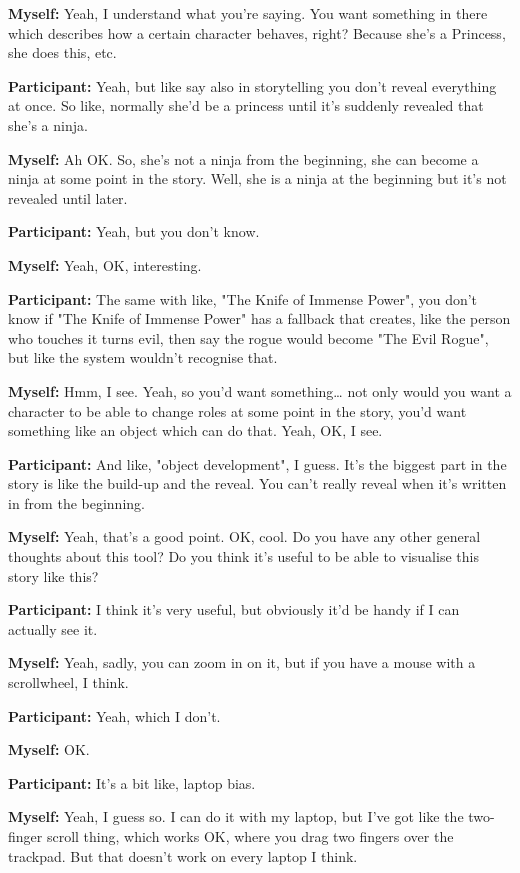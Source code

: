 \documentclass[11pt]{report}
\newcommand{\llabel}[1]{\hypertarget{llineno:#1}{\linelabel{#1}}}
\begin{document}
\begin{linenumbers}
\textbf{Myself:} Yeah, I understand what you're saying. You want something in there which describes how a certain character behaves, right? Because she's a Princess, she does this, etc.

\textbf{Participant:} Yeah, but like say also in storytelling you don't reveal everything at once. So like, normally she'd be a princess until it's suddenly revealed that she's a ninja.\llabel{lne:feature7c}

\textbf{Myself:} Ah OK. So, she's not a ninja from the beginning, she can become a ninja at some point in the story. Well, she is a ninja at the beginning but it's not revealed until later.

\textbf{Participant:} Yeah, but you don't know.

\textbf{Myself:} Yeah, OK, interesting.

\textbf{Participant:} The same with like, "The Knife of Immense Power", you don't know if "The Knife of Immense Power" has a fallback that creates, like the person who touches it turns evil, then say the rogue would become "The Evil Rogue", but like the system wouldn't recognise that.

\textbf{Myself:} Hmm, I see. Yeah, so you'd want something\ldots{} not only would you want a character to be able to change roles at some point in the story, you'd want something like an object which can do that. Yeah, OK, I see.

\textbf{Participant:} And like, "object development", I guess. It's the biggest part in the story is like the build-up and the reveal. You can't really reveal when it's written in from the beginning.

\textbf{Myself:} Yeah, that's a good point. OK, cool. Do you have any other general thoughts about this tool? Do you think it's useful to be able to visualise this story like this?

\textbf{Participant:} I think it's very useful, but obviously it'd be handy if I can actually see it.

\textbf{Myself:} Yeah, sadly, you can zoom in on it, but if you have a mouse with a scrollwheel, I think.

\textbf{Participant:} Yeah, which I don't.

\textbf{Myself:} OK.

\textbf{Participant:} It's a bit like, laptop bias.

\textbf{Myself:} Yeah, I guess so. I can do it with my laptop, but I've got like the two-finger scroll thing, which works OK, where you drag two fingers over the trackpad. But that doesn't work on every laptop I think.


\end{linenumbers}
\end{document}
